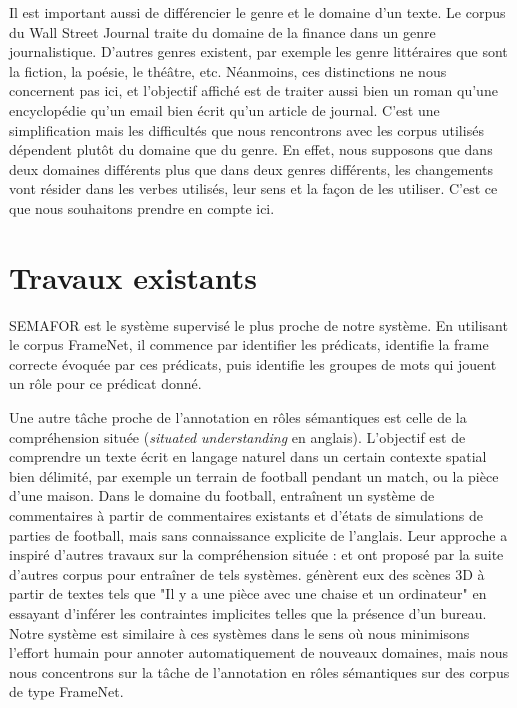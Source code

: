 
Il est important aussi de différencier le genre et le domaine d'un texte. Le
corpus du Wall Street Journal traite du domaine de la finance dans un genre
journalistique. D'autres genres existent, par exemple les genre littéraires que
sont la fiction, la poésie, le théâtre, etc. Néanmoins, ces distinctions ne
nous concernent pas ici, et l'objectif affiché est de traiter aussi bien un
roman qu'une encyclopédie qu'un email bien écrit qu'un article de journal.
C'est une simplification mais les difficultés que nous rencontrons avec les
corpus utilisés dépendent plutôt du domaine que du genre. En effet, nous
supposons que dans deux domaines différents plus que dans deux genres
différents, les changements vont résider dans les verbes utilisés, leur sens et
la façon de les utiliser. C'est ce que nous souhaitons prendre en compte ici.

\section{Travaux existants}

SEMAFOR \citep{das2014frame} est le système supervisé le plus proche de notre
système. En utilisant le corpus FrameNet, il commence par identifier les
prédicats, identifie la frame correcte évoquée par ces prédicats, puis
identifie les groupes de mots qui jouent un rôle pour ce prédicat donné.

Une autre tâche proche de l'annotation en rôles sémantiques est celle de la
compréhension située (\emph{situated understanding} en anglais). L'objectif est
de comprendre un texte écrit en langage naturel dans un certain contexte
spatial bien délimité, par exemple un terrain de football pendant un match, ou
la pièce d'une maison. Dans le domaine du football, \cite{chen2008learning}
entraînent un système de commentaires à partir de commentaires existants et
d'états de simulations de parties de football, mais sans connaissance explicite
de l'anglais. Leur approche a inspiré d'autres travaux sur la compréhension
située : \citep{bordes2010towards} et \cite{richardson2012towards} ont proposé
par la suite d'autres corpus pour entraîner de tels systèmes.
\cite{chang2014learning} génèrent eux des scènes 3D à partir de textes tels que
"Il y a une pièce avec une chaise et un ordinateur" en essayant d'inférer les
contraintes implicites telles que la présence d'un bureau. Notre système est
similaire à ces systèmes dans le sens où nous minimisons l'effort humain pour
annoter automatiquement de nouveaux domaines, mais nous nous concentrons sur la
tâche de l'annotation en rôles sémantiques sur des corpus de type FrameNet.


